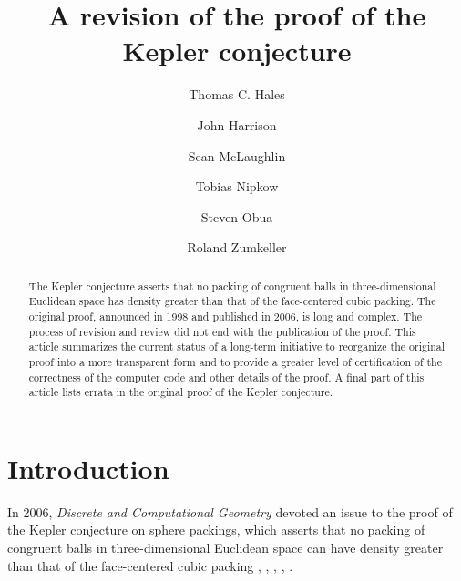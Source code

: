 \documentclass[11pt]{amsart}
\begin{document}
\title{A revision of the proof of the Kepler conjecture}

\author[Hales]{Thomas C. Hales}
\address[T.~Hales]{Math Department, University of Pittsburgh}

\author[Harrison]{John Harrison}
\address[J.~Harrison]{Intel Corporation,  JF1-13, 2111 NE 25th Avenue
 Hillsboro, OR 97124
 USA}

\author[McLaughlin]{Sean McLaughlin}
\address[S.~McLaughlin]{Carnegie Mellon University}

\author[Nipkow]{Tobias Nipkow}
\address[T.~Nipkow]{Department for Informatics, Technische Universit\"at
M\"unchen}

\author[Obua]{Steven Obua}
\address[S.~Obua]{Department for Informatics, Technische Universit\"at
M\"unchen}

\author[Zumkeller]{Roland Zumkeller}
\address[R.~Zumkeller]{\'Ecole Polytechnique, Paris}

\begin{abstract}
The Kepler conjecture asserts that no packing of congruent balls in three-dimensional Euclidean space 
has density greater than that of the face-centered cubic packing.  The original proof,
announced in 1998 and published in 2006, is long and complex. The process of  revision and review did not end with the publication of the proof.
This article summarizes the current status of a long-term initiative to
reorganize the original proof into a more transparent form and to provide a greater
level of certification of the correctness of the computer code and other details of the proof.
A final part of this article lists errata in the original proof of the Kepler conjecture.
\end{abstract}


\maketitle
\setcounter{tocdepth}{1}

{
\parskip=0pt

\tableofcontents

}

\section*{Introduction}

In 2006, {\it Discrete and Computational Geometry} devoted an issue to the
proof of the Kepler conjecture on sphere packings, which asserts that no
packing of congruent balls in three-dimensional Euclidean space can
have density greater than that of the face-centered cubic packing \cite{Hales:2006:DCG}, \cite{Hales:2006:DCG:3}, \cite{Hales:2006:DCG:4}, \cite{Hales:2006:DCG:6}, \cite{Ferguson:2006:DCG:5}.
\end{document}

